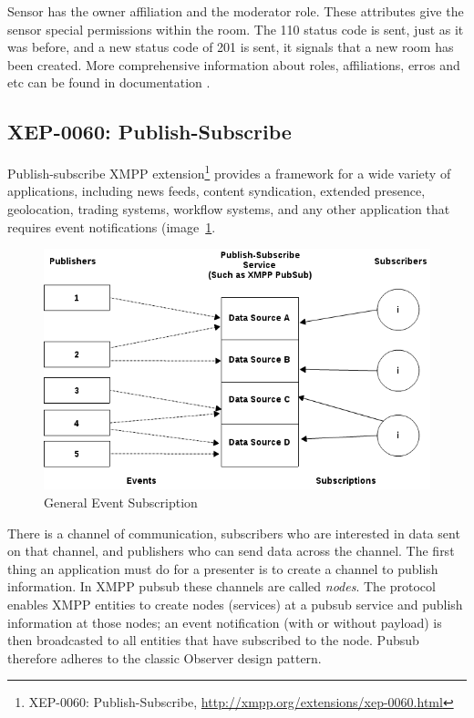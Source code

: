 Sensor has the owner affiliation and the moderator role. These attributes give the sensor special permissions within the room. The 110 status code is sent, just as it was before, and a new status code of 201 is sent, it signals that a new room has been created. More comprehensive information about roles, affiliations, erros and etc can be found in documentation \cite{XMPPbook}.

\subsection{XEP-0060: Publish-Subscribe}
Publish-subscribe XMPP extension\footnote{XEP-0060: Publish-Subscribe, \url{http://xmpp.org/extensions/xep-0060.html}} provides a framework for a wide variety of applications, including news feeds, content syndication, extended presence, geolocation, trading systems, workflow systems, and any other application that requires event notifications (image~\ref{img:basic-pubsub}.

\begin{figure}[!ht]
    \centering
    \includegraphics[scale=0.5]{images/XEP0049.png}   
    \caption[General Event Subscription]{General Event Subscription}  
    \label{img:basic-pubsub}                    
\end{figure}

There is a channel of communication, subscribers who are interested in data sent on that channel, and publishers who can send data across the channel. The first thing an application must do for a presenter is to create a channel to publish information. In XMPP pubsub these channels are called \emph{nodes}. The protocol enables XMPP entities to create nodes (services) at a pubsub service and publish information at those nodes; an event notification (with or without payload) is then broadcasted to all entities that have subscribed to the node. Pubsub therefore adheres to the classic Observer design pattern.

